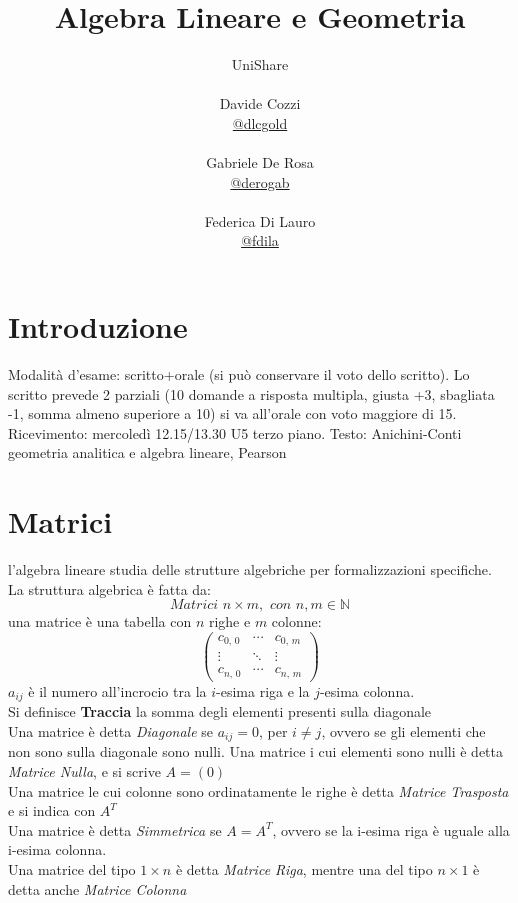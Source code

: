 \documentclass[a4paper,12pt, oneside]{book}
\title{Algebra Lineare e Geometria}
\author{UniShare\\\\Davide Cozzi\\\href{https://t.me/dlcgold}{@dlcgold}\\\\Gabriele De Rosa\\\href{https://t.me/derogab}{@derogab} \\\\Federica Di Lauro\\\href{https://t.me/f_dila}{@f\textunderscore dila}}
\date{}
\begin{document}
\maketitle


\newtheorem{teorema}{Teorema}
\newtheorem{definizione}{Definizione}
\newtheorem{esempio}{Esempio}
\newtheorem{corollario}{Corollario}
\newtheorem{lemma}{Lemma}
\newtheorem{osservazione}{Osservazione}
\newtheorem{nota}{Nota}
\newtheorem{esercizio}{Esercizio}
\tableofcontents
\renewcommand{\chaptermark}[1]{%
\markboth{\chaptername
\ \thechapter.\ #1}{}}
\renewcommand{\sectionmark}[1]{\markright{\thesection.\ #1}}
    \newcommand{\norm}[1]{ \left\lVert {#1} \right\rVert}
\chapter{Introduzione}
Modalità d'esame: scritto+orale (si può conservare il voto dello scritto). Lo scritto prevede 2 parziali (10 domande a risposta multipla, giusta +3, sbagliata -1, somma almeno superiore a 10) si va all'orale con voto maggiore di 15.
Ricevimento: mercoledì 12.15/13.30 U5 terzo piano.
Testo: Anichini-Conti geometria analitica e algebra lineare, Pearson

\chapter{Matrici}
l'algebra lineare studia delle strutture algebriche per formalizzazioni specifiche.
La struttura algebrica è fatta da:
$$Matrici\,\,n\times m,\,\, con \,\, n,m\in\mathbb{N}$$
una matrice è una tabella con $n$ righe e $m$ colonne:
$$\left(\begin{matrix}
c_{0,\,0} & \cdots & c_{0,\,m}\\
\vdots & \ddots & \vdots\\
c_{n,\,0} & \cdots & c_{n,\,m}
\end{matrix}\right)$$
$a_{ij}$ è il numero all'incrocio tra la $i$-esima riga e la $j$-esima colonna.\\
Si definisce \textbf{Traccia} la somma degli elementi presenti sulla diagonale\\
Una matrice è detta \textit{Diagonale} se $a_{ij}=0$, per $i\neq j$, ovvero se gli elementi che non sono sulla diagonale sono nulli.
Una matrice i cui elementi sono nulli è detta \textit{Matrice Nulla}, e si scrive $A=(0)$\\
Una matrice le cui colonne sono ordinatamente le righe è detta \textit{Matrice Trasposta} e si indica con $A^T$\\
Una matrice è detta \textit{Simmetrica} se $A=A^T$, ovvero se la i-esima riga è uguale alla i-esima colonna.\\
Una matrice del tipo $1\times n$ è detta \textit{Matrice Riga}, mentre una del tipo $n\times 1$ è detta anche \textit{Matrice Colonna}
\end{document}
